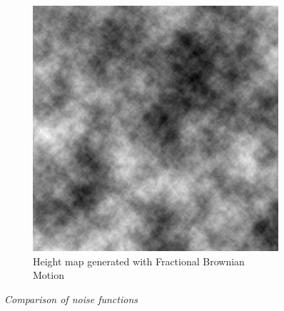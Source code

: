 \begin{figure}[H]
\begin{subfigure}{.5\textwidth}
  \includegraphics[width=0.9\linewidth]{images/FracBrownMotion.png}
  \caption{Height map generated with Fractional Brownian Motion}
  \label{fig:sub2}
\end{subfigure}
\caption[Noise comparison]{\textit{Comparison of noise functions}}
\label{fig:R_kitchen_example}
\end{figure}

